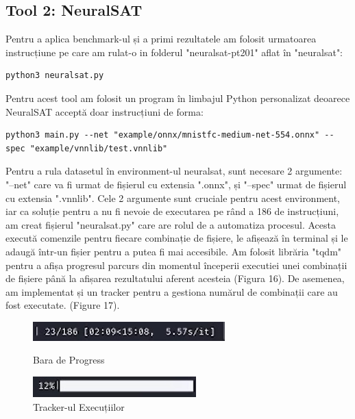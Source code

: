 \documentclass[12pt,a4paper]{article}
\theoremstyle{definition}
\theoremstyle{remark}
\begin{document}
\subsection{Tool 2: NeuralSAT}
Pentru a aplica benchmark-ul și a primi rezultatele am folosit urmatoarea instrucțiune pe care am rulat-o in folderul "neuralsat-pt201" aflat în "neuralsat": 
\begin{lstlisting}[style=bashstyle]
    python3 neuralsat.py
\end{lstlisting}
Pentru acest tool am folosit un program în limbajul Python personalizat deoarece NeuralSAT acceptă doar instrucțiuni de forma: 
\begin{lstlisting}[style=bashstyle]
    python3 main.py --net "example/onnx/mnistfc-medium-net-554.onnx" --spec "example/vnnlib/test.vnnlib"
\end{lstlisting} \par
Pentru a rula datasetul în environment-ul neuralsat, sunt necesare 2 argumente: "--net" care va fi urmat de fișierul cu extensia ".onnx", și "--spec" urmat de fișierul cu extensia ".vnnlib". Cele 2 argumente sunt cruciale pentru acest environment, iar ca soluție pentru a nu fi nevoie de executarea pe rând a 186 de instrucțiuni, am creat fișierul "neuralsat.py" care are rolul de a automatiza procesul. Acesta execută comenzile pentru fiecare combinație de fișiere, le afișează în terminal și le adaugă într-un fișier pentru a putea fi mai accesibile. Am folosit librăria "tqdm" pentru a afișa progresul parcurs din momentul începerii executiei unei combinații de fișiere până la afișarea rezultatului aferent acesteia (Figura 16). De asemenea, am implementat și un tracker pentru a gestiona numărul de combinații care au fost executate. (Figure 17). \par
\begin{figure}[!htb]
   \begin{minipage}{0.48\textwidth}
     \centering
     \includegraphics[width=.8\linewidth]{progres1.jpg}
     \caption{Bara de Progress}\label{Fig:Data1}
   \end{minipage}\hfill
   \begin{minipage}{0.48\textwidth}
     \centering
     \includegraphics[width=.8\linewidth]{Untitled.jpg}
     \caption{Tracker-ul Execuțiilor}\label{Fig:Data2}
   \end{minipage}
\end{figure}
\end{document}
